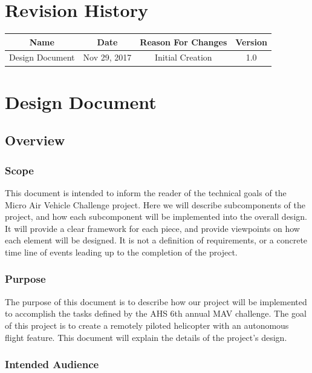 \documentclass[onecolumn, draftclsnofoot,10pt, compsoc]{IEEEtran}
\begin{document}
\section*{Revision History}

\begin{center}
    \begin{tabular}{|c|c|c|c|}
        \hline
		Name & Date & Reason For Changes & Version\\
        \hline
		Design Document & Nov 29, 2017 & Initial Creation & 1.0\\
		\hline 
    \end{tabular}
\end{center}


\section{Design Document}



\subsection{Overview}


\subsubsection{Scope}%

This document is intended to inform the reader of the technical goals of the Micro Air Vehicle Challenge project. Here we will describe subcomponents of the project, and how each subcomponent will be implemented into the overall design. It will provide a clear framework for each piece, and provide viewpoints on how each element will be designed. It is not a definition of requirements, or a concrete time line of events leading up to the completion of the project.


\subsubsection{Purpose}%

The purpose of this document is to describe how our project will be implemented to accomplish the tasks defined by the AHS 6th annual MAV challenge. The goal of this project is to create a remotely piloted helicopter with an autonomous flight feature. This document will explain the details of the project's design.


\subsubsection{Intended Audience}
\end{document}
